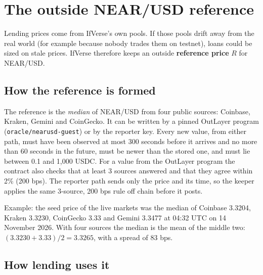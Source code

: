 \documentclass[11pt,a4paper]{article}
\newcommand{\code}[1]{\texttt{\small #1}}
\begin{document}
\section{The outside NEAR/USD reference}
\label{sec:reference}

Lending prices come from IfVerse's own pools. If those pools drift away from the real world (for example because
nobody trades them on testnet), loans could be sized on stale prices. IfVerse therefore keeps an outside
\textbf{reference price} $R$ for NEAR/USD.

\subsection{How the reference is formed}

The reference is the \emph{median} of NEAR/USD from four public sources: Coinbase, Kraken, Gemini and CoinGecko. It
can be written by a pinned OutLayer program (\code{oracle/nearusd-guest}) or by the reporter key. Every new value,
from either path, must have been observed at most 300 seconds before it arrives and no more than 60 seconds in the
future, must be newer than the stored one, and must lie between 0.1 and 1,000 USDC. For a value from the OutLayer
program the contract also checks that at least 3 sources answered and that they agree within 2\% (200 bps). The
reporter path sends only the price and its time, so the keeper applies the same 3-source, 200 bps rule off chain
before it posts.

Example: the seed price of the live markets was the median of Coinbase 3.3204, Kraken 3.3230, CoinGecko 3.33 and
Gemini 3.3477 at 04:32 UTC on 14 November 2026. With four sources the median is the mean of the middle two:
$(3.3230 + 3.33)/2 = 3.3265$, with a spread of 83 bps.

\subsection{How lending uses it}
\end{document}
